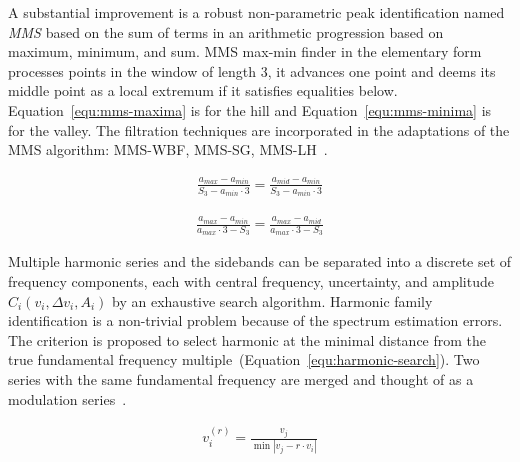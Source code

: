 A substantial improvement is a robust non-parametric peak identification named \emph{MMS} based on the sum of terms in an arithmetic progression based on maximum, minimum, and sum. MMS max-min finder in the elementary form processes points in the window of length 3, it advances one point and deems its middle point as a local extremum if it satisfies equalities below. Equation~\ref{equ:mms-maxima} is for the hill and Equation~\ref{equ:mms-minima} is for the valley. The filtration techniques are incorporated in the adaptations of the MMS algorithm: MMS-WBF, MMS-SG, MMS-LH~\cite{adikaram_non-parametric_2016}.

\begin{ceqn}\begin{align}
\frac{a_{max} - a_{min}}{S_3 - a_{min} \cdot 3} = \frac{a_{mid} - a_{min}}{S_3 - a_{min} \cdot 3}
\label{equ:mms-maxima}
\end{align}\end{ceqn}

\begin{ceqn}\begin{align}
\frac{a_{max} - a_{min}}{a_{max} \cdot 3 - S_3} = \frac{a_{max} - a_{mid}}{a_{max} \cdot 3 - S_3}
\label{equ:mms-minima}
 \end{align}\end{ceqn}

Multiple harmonic series and the sidebands can be separated into a discrete set of frequency components, each with central frequency, uncertainty, and amplitude $C_i(v_i, \Delta v_i, A_i)$ by an exhaustive search algorithm. Harmonic family identification is a non-trivial problem because of the spectrum estimation errors. The criterion is proposed to select harmonic at the minimal distance from the true fundamental frequency multiple~(Equation~\ref{equ:harmonic-search}). Two series with the same fundamental frequency are merged and thought of as a modulation series~\cite{gerber_identification_2013}.

\begin{ceqn}\begin{align}
v_i^{(r)} = \frac{v_j}{\min{|v_j - r \cdot v_i|}}
\label{equ:harmonic-search}
\end{align}\end{ceqn}
 
